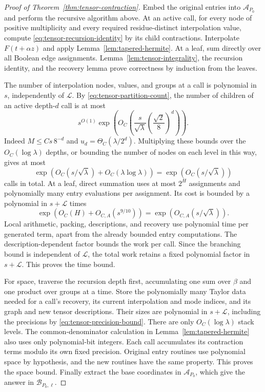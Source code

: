 \begin{proof}[Proof of Theorem~\ref{thm:tensor-contraction}]
Embed the original entries into $\mathcal A_{P_0}$ and perform
the recursive algorithm above.  At an active call, for every node
of positive multiplicity and every required residue-distinct
interpolation value, compute \eqref{eq:tensor-recursion-identity}
by its child contractions.  Interpolate $F(t+\alpha z)$ and apply
Lemma~\ref{lem:tapered-hermite}.  At a leaf, sum directly over all
Boolean edge assignments.  Lemma~\ref{lem:tensor-integrality},
the recursion identity, and the recovery lemma prove correctness
by induction from the leaves.

The number of interpolation nodes, values, and groups at a call
is polynomial in $s$, independently of $\mathcal L$.
By \eqref{eq:tensor-partition-count}, the number of children of
an active depth-$d$ call is at most
\[
 s^{O(1)}\exp\left(
       O_C\left(\frac{s}{\sqrt\lambda}
                    \left(\frac{\sqrt2}{8}\right)^d\right)\right).
\]
Indeed $M\le Cs\,8^{-d}$ and
$u_d=\Theta_C(\lambda/2^d)$.  Multiplying these bounds over the
$O_C(\log\lambda)$ depths, or bounding the number of nodes on
each level in this way, gives at most
\[
 \exp\left(O_C(s/\sqrt\lambda)
                   +O_C(\lambda\log\lambda)\right)
       =\exp(O_C(s/\sqrt\lambda))
\]
calls in total.  At a leaf, direct summation uses at most $2^H$
assignments and polynomially many entry evaluations per assignment.
Its cost is bounded by a polynomial in $s+\mathcal L$ times
\[
 \exp(O_C(H)+O_{C,A}(s^{9/10}))
   =\exp(O_{C,A}(s/\sqrt\lambda)).
\]
Local arithmetic, packing, descriptions, and recovery use
polynomial time per generated term, apart from the already
bounded entry computations.  The description-dependent factor
bounds the work per call. Since the branching bound is independent of
$\mathcal L$, the total work retains a fixed polynomial factor in $s+\mathcal L$.
This proves the time bound.

For space, traverse the recursion depth first, accumulating one
sum over $\beta$ and one product over groups at a time.
Store the polynomially many Taylor data needed for a call's
recovery, its current interpolation and mode indices, and its
graph and new tensor descriptions.  Their sizes are polynomial
in $s+\mathcal L$, including the precisions by
\eqref{eq:tensor-precision-bound}.  There are only
$O_C(\log\lambda)$ stack levels.  The common-denominator
calculation in Lemma~\ref{lem:tapered-hermite} also uses only
polynomial-bit integers. Each call accumulates its contraction terms
modulo its own fixed precision.
Original entry routines use polynomial space by hypothesis,
and the new routines have the same property.
This proves the space bound.  Finally extract the base
coordinates in $\mathcal A_{P_0}$, which give the answer in
$\mathcal B_{P_0,\ell}$.
\end{proof}
